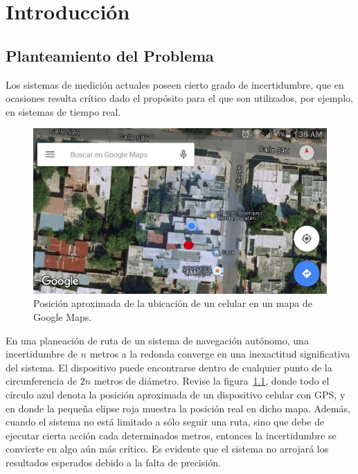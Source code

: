 
\chapter{Introducción} %

\label{chap:Intro} %


\newcommand{\keyword}[1]{\textbf{#1}}
\newcommand{\tabhead}[1]{\textbf{#1}}
\newcommand{\code}[1]{\texttt{#1}}
\newcommand{\file}[1]{\texttt{\bfseries#1}}
\newcommand{\option}[1]{\texttt{\itshape#1}}


\section{Planteamiento del Problema}
Los sistemas de medición actuales poseen cierto grado de incertidumbre, que en ocasiones resulta crítico dado el propósito para el que son utilizados, por ejemplo, en sistemas de tiempo real.

\begin{figure}[ht]
\centering
\includegraphics[scale=0.14]{Figures/Pred}
\caption[Mapa Precisión]{Posición aproximada de la ubicación de un celular en un mapa de Google Maps.}
\label{fig:Prec}
\end{figure}

En una planeación de ruta de un sistema de navegación autónomo, una incertidumbre de $n$ metros a la redonda converge en una inexactitud significativa del sistema. El dispositivo puede encontrarse dentro de cualquier punto de la circunferencia de $2n$ metros de diámetro. Revise la figura~\ref{fig:Prec}, donde todo el círculo azul denota la posición aproximada de un dispositivo celular con GPS, y en donde la pequeña elipse roja muestra la posición real en dicho mapa. Además, cuando el sistema no está limitado a sólo seguir una ruta, sino que debe de ejecutar cierta acción cada determinados metros, entonces la incertidumbre se convierte en algo aún más crítico. Es evidente que el sistema no arrojará los resultados esperados debido a la falta de precisión.

